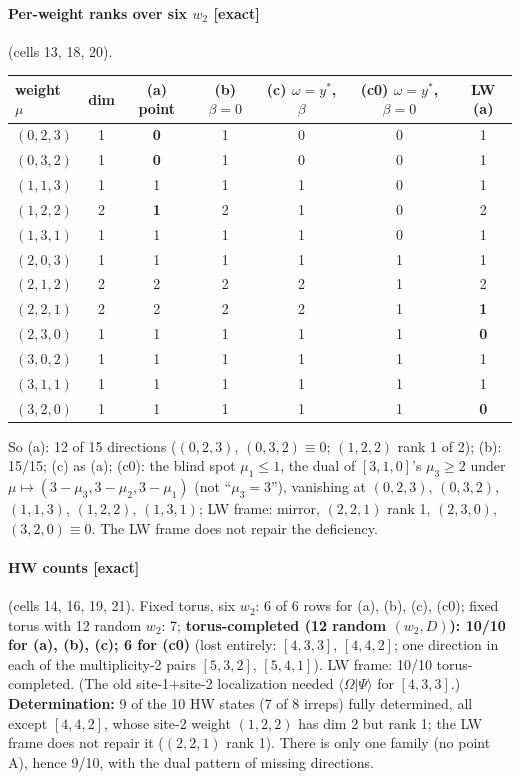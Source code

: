 \documentclass[11pt]{article}
\newcommand{\Om}{\Omega}
\newcommand{\ex}{\textbf{[exact]}}
\begin{document}
\paragraph{Per-weight ranks over six $w_2$ \ex} (cells 13, 18, 20).
\begin{center}\small
\begin{tabular}{@{}lcccccc@{}}\toprule
weight $\mu$ & dim & (a) point & (b) $\beta{=}0$ & (c) $\omega{=}y^*$, $\beta$ & (c0) $\omega{=}y^*$, $\beta{=}0$ & LW (a)\\\midrule
$(0,2,3)$&1&\textbf{0}&1&0&0&1\\
$(0,3,2)$&1&\textbf{0}&1&0&0&1\\
$(1,1,3)$&1&1&1&1&0&1\\
$(1,2,2)$&2&\textbf{1}&2&1&0&2\\
$(1,3,1)$&1&1&1&1&0&1\\
$(2,0,3)$&1&1&1&1&1&1\\
$(2,1,2)$&2&2&2&2&1&2\\
$(2,2,1)$&2&2&2&2&1&\textbf{1}\\
$(2,3,0)$&1&1&1&1&1&\textbf{0}\\
$(3,0,2)$&1&1&1&1&1&1\\
$(3,1,1)$&1&1&1&1&1&1\\
$(3,2,0)$&1&1&1&1&1&\textbf{0}\\\bottomrule
\end{tabular}
\end{center}
So (a): 12 of 15 directions ($(0,2,3)$, $(0,3,2)\equiv0$; $(1,2,2)$ rank 1 of 2); (b): 15/15; (c) as (a); (c0): the blind spot $\mu_1\le1$, the dual of $[3,1,0]$'s $\mu_3\ge2$ under $\mu\mapsto(3-\mu_3,3-\mu_2,3-\mu_1)$ (not ``$\mu_3=3$''), vanishing at $(0,2,3)$, $(0,3,2)$, $(1,1,3)$, $(1,2,2)$, $(1,3,1)$; LW frame: mirror, $(2,2,1)$ rank 1, $(2,3,0)$, $(3,2,0)\equiv0$. The LW frame does not repair the deficiency.

\paragraph{HW counts \ex} (cells 14, 16, 19, 21). Fixed torus, six $w_2$: 6 of 6 rows for (a), (b), (c), (c0); fixed torus with 12 random $w_2$: 7; \textbf{torus-completed (12 random $(w_2,D)$): 10/10 for (a), (b), (c); 6 for (c0)} (lost entirely: $[4,3,3]$, $[4,4,2]$; one direction in each of the multiplicity-2 pairs $[5,3,2]$, $[5,4,1]$). LW frame: 10/10 torus-completed. (The old site-1$+$site-2 localization needed $\langle\Om|\Psi\rangle$ for $[4,3,3]$.) \textbf{Determination:} 9 of the 10 HW states (7 of 8 irreps) fully determined, all except $[4,4,2]$, whose site-2 weight $(1,2,2)$ has dim 2 but rank 1; the LW frame does not repair it ($(2,2,1)$ rank 1). There is only one family (no point A), hence 9/10, with the dual pattern of missing directions.
\end{document}
